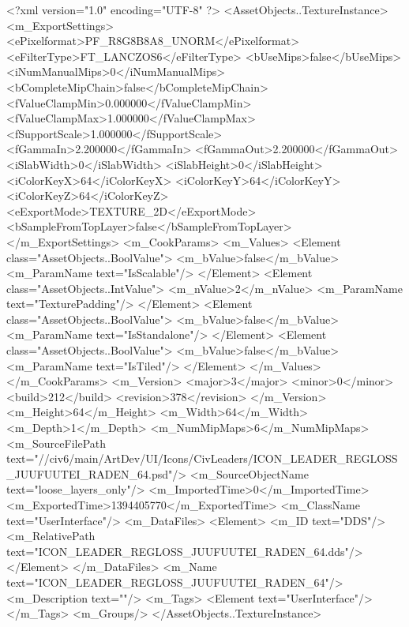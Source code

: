 <?xml version="1.0" encoding="UTF-8" ?>
<AssetObjects..TextureInstance>
	<m_ExportSettings>
		<ePixelformat>PF_R8G8B8A8_UNORM</ePixelformat>
		<eFilterType>FT_LANCZOS6</eFilterType>
		<bUseMips>false</bUseMips>
		<iNumManualMips>0</iNumManualMips>
		<bCompleteMipChain>false</bCompleteMipChain>
		<fValueClampMin>0.000000</fValueClampMin>
		<fValueClampMax>1.000000</fValueClampMax>
		<fSupportScale>1.000000</fSupportScale>
		<fGammaIn>2.200000</fGammaIn>
		<fGammaOut>2.200000</fGammaOut>
		<iSlabWidth>0</iSlabWidth>
		<iSlabHeight>0</iSlabHeight>
		<iColorKeyX>64</iColorKeyX>
		<iColorKeyY>64</iColorKeyY>
		<iColorKeyZ>64</iColorKeyZ>
		<eExportMode>TEXTURE_2D</eExportMode>
		<bSampleFromTopLayer>false</bSampleFromTopLayer>
	</m_ExportSettings>
	<m_CookParams>
		<m_Values>
			<Element class="AssetObjects..BoolValue">
				<m_bValue>false</m_bValue>
				<m_ParamName text="IsScalable"/>
			</Element>
			<Element class="AssetObjects..IntValue">
				<m_nValue>2</m_nValue>
				<m_ParamName text="TexturePadding"/>
			</Element>
			<Element class="AssetObjects..BoolValue">
				<m_bValue>false</m_bValue>
				<m_ParamName text="IsStandalone"/>
			</Element>
			<Element class="AssetObjects..BoolValue">
				<m_bValue>false</m_bValue>
				<m_ParamName text="IsTiled"/>
			</Element>
		</m_Values>
	</m_CookParams>
	<m_Version>
		<major>3</major>
		<minor>0</minor>
		<build>212</build>
		<revision>378</revision>
	</m_Version>
	<m_Height>64</m_Height>
	<m_Width>64</m_Width>
	<m_Depth>1</m_Depth>
	<m_NumMipMaps>6</m_NumMipMaps>
	<m_SourceFilePath text="//civ6/main/ArtDev/UI/Icons/CivLeaders/ICON_LEADER_REGLOSS_JUUFUUTEI_RADEN_64.psd"/>
	<m_SourceObjectName text="loose_layers_only"/>
	<m_ImportedTime>0</m_ImportedTime>
	<m_ExportedTime>1394405770</m_ExportedTime>
	<m_ClassName text="UserInterface"/>
	<m_DataFiles>
		<Element>
			<m_ID text="DDS"/>
			<m_RelativePath text="ICON_LEADER_REGLOSS_JUUFUUTEI_RADEN_64.dds"/>
		</Element>
	</m_DataFiles>
	<m_Name text="ICON_LEADER_REGLOSS_JUUFUUTEI_RADEN_64"/>
	<m_Description text=""/>
	<m_Tags>
		<Element text="UserInterface"/>
	</m_Tags>
	<m_Groups/>
</AssetObjects..TextureInstance>

